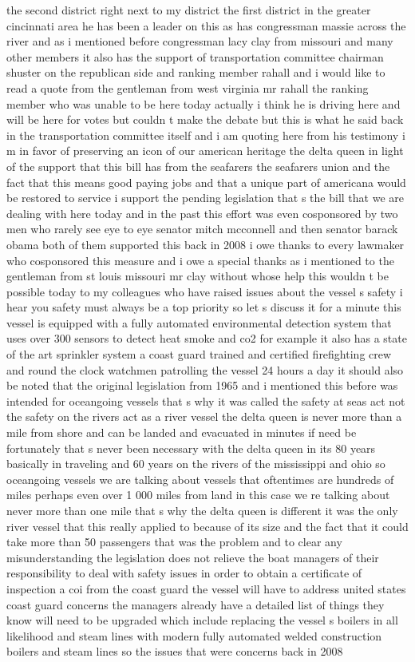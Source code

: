 \documentclass{article}
\begin{document}
the second district right next to my district the first district in the greater cincinnati area he has been a leader on this as has congressman massie across the river and as i mentioned before congressman lacy clay from missouri and many other members it also has the support of transportation committee chairman shuster on the republican side and ranking member rahall and i would like to read a quote from the gentleman from west virginia mr rahall the ranking member who was unable to be here today actually i think he is driving here and will be here for votes but couldn t make the debate but this is what he said back in the transportation committee itself and i am quoting here from his testimony i m in favor of preserving an icon of our american heritage the delta queen in light of the support that this bill has from the seafarers the seafarers union and the fact that this means good paying jobs and that a unique part of americana would be restored to service i support the pending legislation that s the bill that we are dealing with here today and in the past this effort was even cosponsored by two men who rarely see eye to eye senator mitch mcconnell and then senator barack obama both of them supported this back in 2008 i owe thanks to every lawmaker who cosponsored this measure and i owe a special thanks as i mentioned to the gentleman from st louis missouri mr clay without whose help this wouldn t be possible today to my colleagues who have raised issues about the vessel s safety i hear you safety must always be a top priority so let s discuss it for a minute this vessel is equipped with a fully automated environmental detection system that uses over 300 sensors to detect heat smoke and co2 for example it also has a state of the art sprinkler system a coast guard trained and certified firefighting crew and round the clock watchmen patrolling the vessel 24 hours a day it should also be noted that the original legislation from 1965 and i mentioned this before was intended for oceangoing vessels that s why it was called the safety at seas act not the safety on the rivers act as a river vessel the delta queen is never more than a mile from shore and can be landed and evacuated in minutes if need be fortunately that s never been necessary with the delta queen in its 80 years basically in traveling and 60 years on the rivers of the mississippi and ohio so oceangoing vessels we are talking about vessels that oftentimes are hundreds of miles perhaps even over 1 000 miles from land in this case we re talking about never more than one mile that s why the delta queen is different it was the only river vessel that this really applied to because of its size and the fact that it could take more than 50 passengers that was the problem and to clear any misunderstanding the legislation does not relieve the boat managers of their responsibility to deal with safety issues in order to obtain a certificate of inspection a coi from the coast guard the vessel will have to address united states coast guard concerns the managers already have a detailed list of things they know will need to be upgraded which include replacing the vessel s boilers in all likelihood and steam lines with modern fully automated welded construction boilers and steam lines so the issues that were concerns back in 2008 
\end{document}

